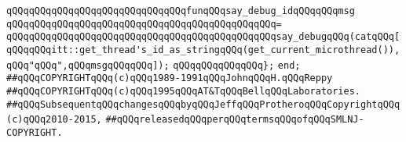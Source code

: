 \verb|qQQqqQQqqQQqqQQqqQQqqQQqqQQqqQQqfunqQQqsay_debug_idqQQqqQQqmsg|\newline
\verb|qQQqqQQqqQQqqQQqqQQqqQQqqQQqqQQqqQQqqQQqqQQqqQQq=|\newline
\verb|qQQqqQQqqQQqqQQqqQQqqQQqqQQqqQQqqQQqqQQqqQQqqQQqsay_debugqQQq(catqQQq[qQQqqQQqitt::get_thread's_id_as_stringqQQq(get_current_microthread()),qQQq"qQQq",qQQqmsgqQQqqQQq]);|\newline
\verb|qQQqqQQqqQQqqQQq};|\newline
\verb|end;|\newline
\newline
\newline
\verb|##qQQqCOPYRIGHTqQQq(c)qQQq1989-1991qQQqJohnqQQqH.qQQqReppy|\newline
\verb|##qQQqCOPYRIGHTqQQq(c)qQQq1995qQQqAT&TqQQqBellqQQqLaboratories.|\newline
\verb|##qQQqSubsequentqQQqchangesqQQqbyqQQqJeffqQQqProtheroqQQqCopyrightqQQq(c)qQQq2010-2015,|\newline
\verb|##qQQqreleasedqQQqperqQQqtermsqQQqofqQQqSMLNJ-COPYRIGHT.|\newline

